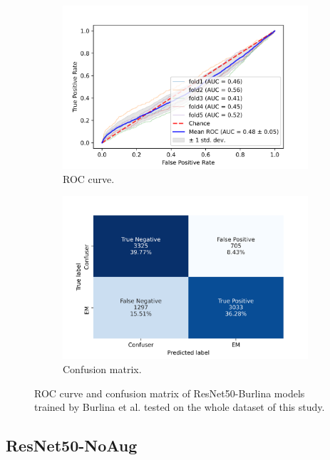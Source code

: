 \begin{figure}[h!]
	\centering
	\begin{subfigure}[b]{0.49\textwidth}
		\centering
		\includegraphics[width=\textwidth,keepaspectratio]{images/Supplement4/image14.png}
		\caption{ROC curve.}
	\end{subfigure}
	\hfill
	\begin{subfigure}[b]{0.49\textwidth}
		\centering
		\includegraphics[width=\textwidth,keepaspectratio]{images/Supplement4/image20.png}
		\caption{Confusion matrix.}
	\end{subfigure}
	\caption{ROC curve and confusion matrix of ResNet50-Burlina models trained by Burlina et al. \cite{Burlina2018} tested on the whole dataset of this study.}
\end{figure}

\vfill\clearpage
\subsection{ResNet50-NoAug}


